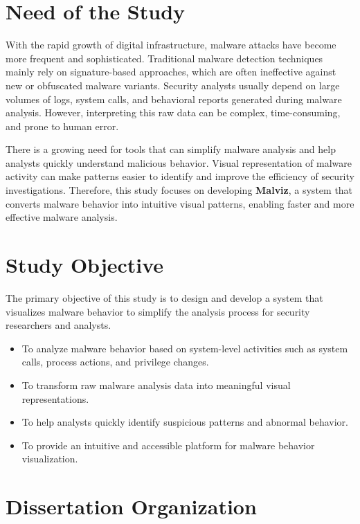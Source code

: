  \section{Need of the Study}

With the rapid growth of digital infrastructure, malware attacks have become more frequent and sophisticated. 
Traditional malware detection techniques mainly rely on signature-based approaches, which are often ineffective against new or obfuscated malware variants. 
Security analysts usually depend on large volumes of logs, system calls, and behavioral reports generated during malware analysis. 
However, interpreting this raw data can be complex, time-consuming, and prone to human error.

There is a growing need for tools that can simplify malware analysis and help analysts quickly understand malicious behavior. 
Visual representation of malware activity can make patterns easier to identify and improve the efficiency of security investigations. 
Therefore, this study focuses on developing \textbf{Malviz}, a system that converts malware behavior into intuitive visual patterns, enabling faster and more effective malware analysis.


\section{Study Objective}

The primary objective of this study is to design and develop a system that visualizes malware behavior to simplify the analysis process for security researchers and analysts.

\begin{itemize}
    \item To analyze malware behavior based on system-level activities such as system calls, process actions, and privilege changes.
    \item To transform raw malware analysis data into meaningful visual representations.
    \item To help analysts quickly identify suspicious patterns and abnormal behavior.
    \item To provide an intuitive and accessible platform for malware behavior visualization.
\end{itemize}


\section{Dissertation Organization}

